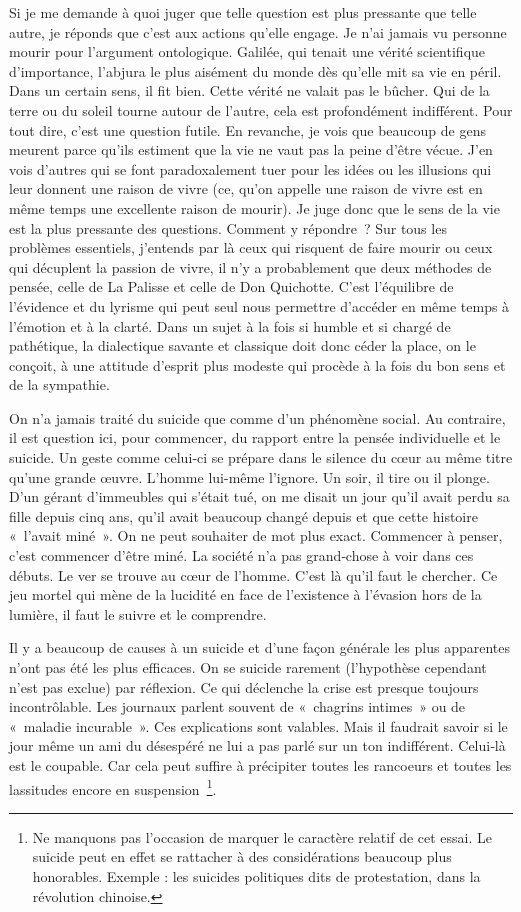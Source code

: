 \documentclass{book}
\begin{document}
Si je me demande à quoi juger que telle question est plus pressante que telle autre, je réponds que c'est aux actions qu'elle engage. Je n'ai jamais vu personne mourir pour l'argument ontologique. Galilée, qui tenait une vérité scientifique d'importance, l'abjura le plus aisément du monde dès qu'elle mit sa vie en péril. Dans un certain sens, il fit bien. Cette vérité ne valait pas le bûcher. Qui de la terre ou du soleil tourne autour de l'autre, cela est profondément indifférent. Pour tout dire, c'est une question futile. En revanche, je vois que beaucoup de gens meurent parce qu'ils estiment que la vie ne vaut pas la peine d'être vécue. J'en vois d'autres qui se font paradoxalement tuer pour les idées ou les illusions qui leur donnent une raison de vivre (ce, qu'on appelle une raison de vivre est en même temps une excellente raison de mourir). Je juge donc que le sens de la vie est la plus pressante des questions. Comment y répondre ? Sur tous les problèmes essentiels, j'entends par là ceux qui risquent de faire mourir ou ceux qui décuplent la passion de vivre, il n'y a probablement que deux méthodes de pensée, celle de La Palisse et celle de Don Quichotte. C'est l'équilibre de l'évidence et du lyrisme qui peut seul nous permettre d'accéder en même temps à l'émotion et à la clarté. Dans un sujet à la fois si humble et si chargé de pathétique, la dialectique savante et classique doit donc céder la place, on le conçoit, à une attitude d'esprit plus modeste qui procède à la fois du bon sens et de la sympathie.

On n'a jamais traité du suicide que comme d'un phénomène social. Au contraire, il est question ici, pour commencer, du rapport entre la pensée individuelle et le suicide. Un geste comme celui‑ci se prépare dans le silence du cœur au même titre qu'une grande œuvre. L'homme lui-même l'ignore. Un soir, il tire ou il plonge. D'un gérant d'immeubles qui s'était tué, on me disait un jour qu'il avait perdu sa fille depuis cinq ans, qu'il avait beaucoup changé depuis et que cette histoire « l'avait miné ». On ne peut souhaiter de mot plus exact. Commencer à penser, c'est commencer d'être miné. La société n'a pas grand‑chose à voir dans ces débuts. Le ver se trouve au cœur de l'homme. C'est là qu'il faut le chercher. Ce jeu mortel qui mène de la lucidité en face de l'existence à l'évasion hors de la lumière, il faut le suivre et le comprendre.

Il y a beaucoup de causes à un suicide et d'une façon générale les plus apparentes n'ont pas été les plus efficaces. On se suicide rarement (l'hypothèse cependant n'est pas exclue) par réflexion. Ce qui déclenche la crise est presque toujours incontrôlable. Les journaux parlent souvent de « chagrins intimes » ou de « maladie incurable ». Ces explications sont valables. Mais il faudrait savoir si le jour même un ami du désespéré ne lui a pas parlé sur un ton indifférent. Celui‑là est le coupable. Car cela peut suffire à précipiter toutes les rancoeurs et toutes les lassitudes encore en suspension \footnote{Ne manquons pas l’occasion de marquer le caractère relatif de cet essai. Le suicide peut en effet se rattacher à des considérations beaucoup plus honorables. Exemple : les suicides politiques dits de protestation, dans la révolution chinoise.}.
\end{document}
